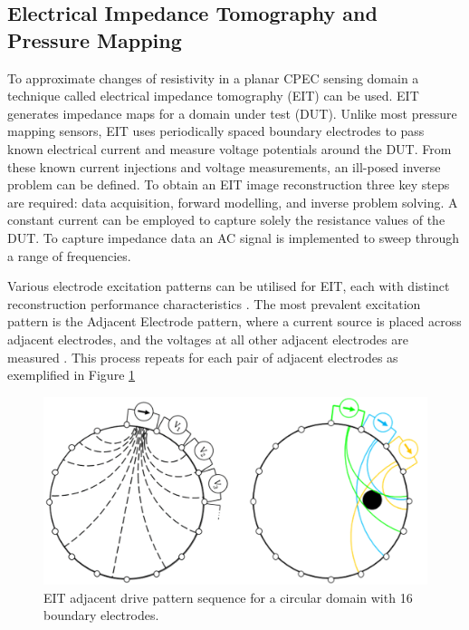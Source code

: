 \subsection{Electrical Impedance Tomography and Pressure Mapping}
To approximate changes of resistivity in a planar CPEC sensing domain a technique called electrical impedance tomography (EIT) can be used. EIT generates impedance maps for a domain under test (DUT). Unlike most pressure mapping sensors, EIT uses periodically spaced boundary electrodes to pass known electrical current and measure voltage potentials around the DUT. From these known current injections and voltage measurements, an ill-posed inverse problem can be defined. To obtain an EIT image reconstruction three key steps are required: data acquisition, forward modelling, and inverse problem solving. A constant current can be employed to capture solely the resistance values of the DUT. To capture impedance data an AC signal is implemented to sweep through a range of frequencies. 

Various electrode excitation patterns can be utilised for EIT, each with distinct reconstruction performance characteristics \citep{Russo2017,Sherry2006,Brown1987}. The most prevalent excitation pattern is the Adjacent Electrode pattern, where a current source is placed across adjacent electrodes, and the voltages at all other adjacent electrodes are measured \citep{Adler2021}. This process repeats for each pair of adjacent electrodes as exemplified in Figure \ref{fig:EIT_adj_drive}
\begin{figure}[H]
	\centering
	\includegraphics[width=0.8\linewidth]{Figures/eit_sequence.png}
	\caption{EIT adjacent drive pattern sequence for a circular domain with 16 boundary electrodes.}
	\label{fig:EIT_adj_drive}
\end{figure}


